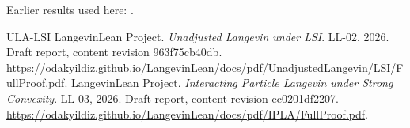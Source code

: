 \documentclass[11pt,a4paper]{article}
\begin{document}
Earlier results used here: \cite[Section~3.1.1]{LangevinLean2026IPLA}.

\begin{thebibliography}{ULA-LSI}
LangevinLean Project. \emph{Unadjusted Langevin under LSI}. LL-02, 2026. Draft report, content revision 963f75cb40db. \url{https://odakyildiz.github.io/LangevinLean/docs/pdf/UnadjustedLangevin/LSI/FullProof.pdf}.
LangevinLean Project. \emph{Interacting Particle Langevin under Strong Convexity}. LL-03, 2026. Draft report, content revision ec0201df2207. \url{https://odakyildiz.github.io/LangevinLean/docs/pdf/IPLA/FullProof.pdf}.
\end{thebibliography}
\end{document}
